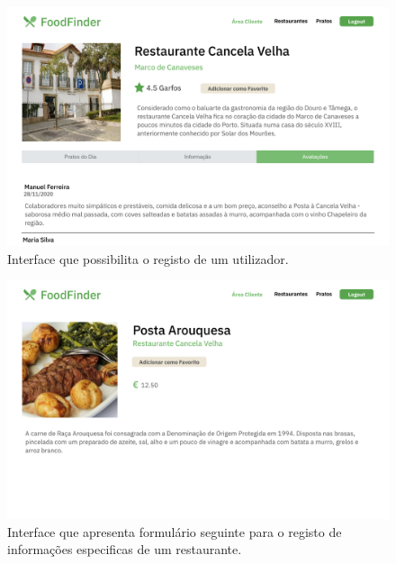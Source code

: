 \documentclass[a4paper,12pt]{report}
\begin{document}
	\begin{figure}[H]
	\begin{center}
	\includegraphics[scale=0.25]{11.1-Screen8}	
	\end{center}
	\caption{Interface que possibilita o registo de um utilizador.}
	\end{figure} 
	
	\begin{figure}[H]
	\begin{center}
	\includegraphics[scale=0.25]{12.1-Screen9}	
	\end{center}
	\caption{Interface que apresenta formulário seguinte para o registo de informações especificas de um restaurante.}
	\end{figure} 
	
\end{document}
